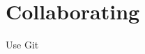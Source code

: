 \documentclass[11pt]{beamer}
\begin{document}
\section{Collaborating}

\begin{frame}
\begin{block}{Use Git}

\end{block}
\end{frame}
\end{document}
